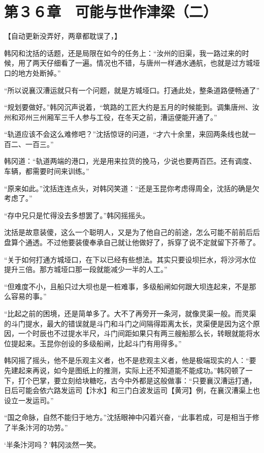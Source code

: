 \section{第３６章　可能与世作津梁（二）}

【自动更新没弄好，两章都耽误了，】

韩冈和沈括的话题，还是局限在如今的任务上：“汝州的旧渠，我一路过来的时候，用了两天仔细看了一遍。情况也不错，与唐州一样通水通航，也就是过方城垭口的地方处断掉。”

“所以说襄汉漕运就只有一个问题，就是方城垭口。打通此处，整条道路便畅通了”

“规划要做好。”韩冈沉声说着，“筑路的工匠大约是五月的时候能到。调集唐州、汝州和邓州三州厢军三千人参与工役，在冬天之前，漕运便能开通了。”

“轨道应该不会这么难修吧？”沈括惊讶的问道，“才六十余里，来回两条线也就一百二、一百三。”

韩冈道：“轨道两端的港口，光是用来拉货的挽马，少说也要两百匹。还有调度、车辆，都需要时间来训练。”

“原来如此。”沈括连连点头，对韩冈笑道：“还是玉昆你考虑得周全，沈括的确是欠考虑了。”

“存中兄只是忙得没去多想罢了。”韩冈摇摇头。

沈括是故意装傻，这么一个聪明人，又是为了他自己的前途，怎么可能不前前后后盘算个通透。不过他要装傻奉承自己就让他做好了，拆穿了说不定就留下芥蒂了。

“关于如何打通方城垭口，在下以已经有些想法。其实只要设坝拦水，将沙河水位提升三倍。那方城垭口那一段就能减少一半的人工。”

“但难度不小，且船只过大坝也是一桩难事，多级船闸如何跟大坝连起来，不是那么容易的事。”

“比起之前的困境，还是简单多了。大不了再旁开一条河，就像灵渠一般。而灵渠的斗门提水，最大的错误就是斗门和斗门之间隔得距离太长，灵渠便是因为这个原因，一个时辰也不过提水半尺，斗门间距如果只有两三艘船那么长，转眼就能将水位提起来。玉昆你创设的多级船闸，比起斗门有用得多。”

韩冈摇了摇头，他不是乐观主义者，也不是悲观主义者，他是极端现实的人：“要先建起来再说，如今是图纸上的推测，实际上还不知道能不能成功。”韩冈顿了一下，打个巴掌，要立刻给块糖吃，古今中外都是这般做事：“只要襄汉漕运打通，日后可能会依六路发运司【汴水】和三门白波发运司【黄河】例，在襄汉漕渠上也设立一发运司。”

“国之命脉，自然不能归于地方。”沈括眼神中闪着兴奋，“此事若成，可是相当于修了半条汴河的功劳。”

‘半条汴河吗？’韩冈淡然一笑。

